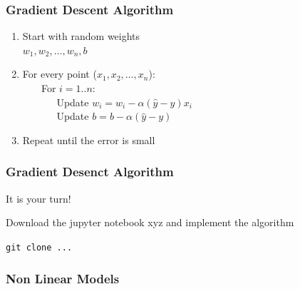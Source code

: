 \begin{frame}[fragile]
  \frametitle{Gradient Descent Algorithm}
  \begin{enumerate}
  \item Start with random weights\\
  $w_1, w_2, \hdots, w_n, b$
  \item For every point ($x_1, x_2, \hdots, x_n$):\\
  \verb|   | For $i=1..n$:\\
  \verb|      | Update $w_i = w_i - \alpha(\hat{y}-y)x_i$\\
  \verb|      | Update $b = b - \alpha(\hat{y}-y)$
  \item Repeat until the error is small
  \end{enumerate}

  \vspace{3mm}

\end{frame}

\begin{frame}[fragile]
  \frametitle{Gradient Desenct Algorithm}
  It is your turn!
  \begin{exercise}
  Download the jupyter notebook xyz and implement the algorithm
  \end{exercise}
  \verb|git clone ...|
\end{frame}

\begin{frame}[fragile]
  \frametitle{Non Linear Models}


\end{frame}
